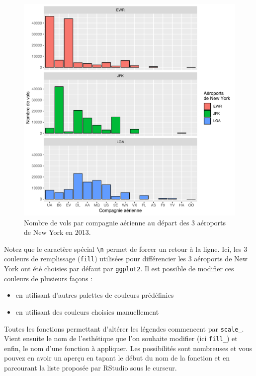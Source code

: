 \documentclass[a4paperpaper,]{article}
\providecommand{\tightlist}{%
  \setlength{\itemsep}{0pt}\setlength{\parskip}{0pt}}
\theoremstyle{definition}
\theoremstyle{definition}
\theoremstyle{definition}
\theoremstyle{remark}
\begin{document}
\begin{figure}[htpb]

{\centering \includegraphics[width=0.9\linewidth]{figure/barfacetbis-1} 

}

\caption{Nombre de vols par compagnie aérienne au départ des 3 aéroports de New York en 2013.}\label{fig:barfacetbis}
\end{figure}

Notez que le caractère spécial \texttt{\textbackslash{}n} permet de
forcer un retour à la ligne. Ici, les 3 couleurs de remplissage
(\texttt{fill}) utilisées pour différencier les 3 aéroports de New York
ont été choisies par défaut par \texttt{ggplot2}. Il est possible de
modifier ces couleurs de plusieurs façons :

\begin{itemize}
\tightlist
\item
  en utilisant d'autres palettes de couleurs prédéfinies
\item
  en utilisant des couleurs choisies manuellement
\end{itemize}

Toutes les fonctions permettant d'altérer les légendes commencent par
\texttt{scale\_}. Vient ensuite le nom de l'esthétique que l'on souhaite
modifier (ici \texttt{fill\_}) et enfin, le nom d'une fonction à
appliquer. Les possibilités sont nombreuses et vous pouvez en avoir un
aperçu en tapant le début du nom de la fonction et en parcourant la
liste proposée par RStudio sous le curseur.
\end{document}
